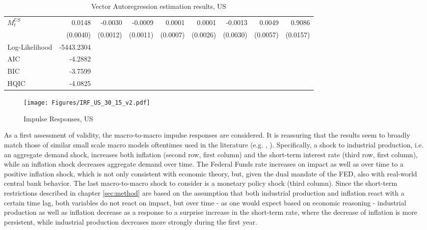 \begin{sidewaystable}
\begin{tabular}{lrrrrrrrr}
    $M^{US}_{t}$ & 0.0148 & -0.0030 & -0.0009 & 0.0001 & 0.0001 & -0.0013 & 0.0049 & 0.9086 \\
     & (0.0040) & (0.0012) & (0.0011) & (0.0007) & (0.0026) & (0.0030) & (0.0057) & (0.0157) \\
    \midrule
    Log-Likelihood & -5443.2304 \\
    AIC & -4.2882 \\
    BIC & -3.7599 \\
    HQIC & -4.0825 \\
    \bottomrule
    \end{tabular}
    \caption{Vector Autoregression estimation results, US}
    \label{tab:VAR_output_US_v2}
\end{sidewaystable}

\begin{sidewaysfigure}
    \centering
    \texttt{[image: Figures/IRF\_US\_30\_15\_v2.pdf]}
    \caption{Impulse Responses, US}
    \label{fig:IRF_US}
\end{sidewaysfigure}


As a first assessment of validity, the macro-to-macro impulse responses are considered. 
It is reassuring that the results seem to broadly match those of similar small scale macro models oftentimes used in the literature (e.g. \citet{gali_1992}, \citet{stock2001vector}). 
Specifically, a shock to industrial production, i.e. an aggregate demand shock, increases both inflation (second row, first column) and the short-term interest rate (third row, first column), while an inflation shock decreases aggregate demand over time. 
The Federal Funds rate increases on impact as well as over time to a positive inflation shock, which is not only consistent with economic theory, but, given the dual mandate of the FED, also with real-world central bank behavior.
The last macro-to-macro shock to consider is a monetary policy shock (third column). 
Since the short-term restrictions described in chapter \ref{sec:method} are based on the assumption that both industrial production and inflation react with a certain time lag, both variables do not react on impact, but over time - as one would expect based on economic reasoning - industrial production as well as inflation decrease as a response to a surprise increase in the short-term rate, where the decrease of inflation is more persistent, while industrial production decreases more strongly during the first year. 

